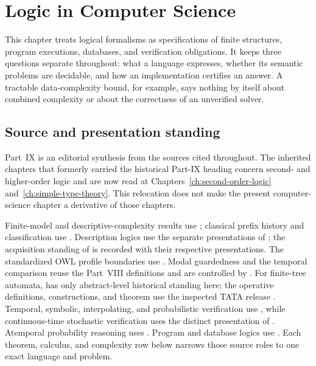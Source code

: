 \chapter{Logic in Computer Science}\label{sec:p09-logic-in-computer-science}

This chapter treats logical formalisms as specifications of finite structures,
program executions, databases, and verification obligations. It keeps three
questions separate throughout: what a language expresses, whether its
semantic problems are decidable, and how an implementation certifies an
answer. A tractable data-complexity bound, for example, says nothing by itself
about combined complexity or about the correctness of an unverified solver.

\section*{Source and presentation standing}
\label{sec:p09-source-standing}

Part~IX is an editorial synthesis from the sources cited throughout.  The
inherited chapters that formerly carried the historical Part-IX heading concern
second- and higher-order logic and are now read at
Chapters~\ref{ch:second-order-logic}
and~\ref{ch:simple-type-theory}.  This relocation does not make the present
computer-science chapter a derivative of those chapters.

Finite-model and descriptive-complexity results use
\textcite{EbbinghausFlum1995,Libkin2004,Immerman1999}; classical prefix history
and classification use
\textcite{Lowenheim1915,Behmann1922,BorgerGradelGurevich1997}.  Description
logics use the separate presentations of
\textcite{SchmidtSchaussSmolka1991,DoniniMassacci2000,
BaaderHorrocksSattler2008}; the acquisition standing of
\textcite{BaaderEtAl2003,BaaderHorrocksLutzSattler2017} is recorded
with their respective presentations.  The
standardized OWL profile boundaries use \textcite{W3COWL2Profiles2012}.
Modal guardedness and the temporal comparison reuse the Part~VIII definitions
and are controlled by \textcite{AndrekaVanBenthemNemeti1998,Kamp1968}.
For finite-tree automata, \textcite{ThatcherWright1968} has only
abstract-level historical standing here; the operative definitions,
constructions, and theorem use the inspected TATA release
\parencite{ComonEtAl2007}.  Temporal,
symbolic, interpolating, and probabilistic verification use
\textcite{Thomas1996Report,ClarkeGrumbergPeled1999,McMillan2003,BaierKatoen2008},
while continuous-time stochastic verification uses the distinct presentation
of \textcite{BaierHaverkortHermannsKatoen2003}.
Atemporal probability reasoning uses
\textcite{FaginHalpernMegiddo1990,Halpern2003}.  Program and database logics use
\textcite{Apt1981,Lloyd1987,ISO13211-1-1995,AbiteboulHullVianu1995}.
Each theorem, calculus, and complexity row below narrows those source roles to
one exact language and problem.

